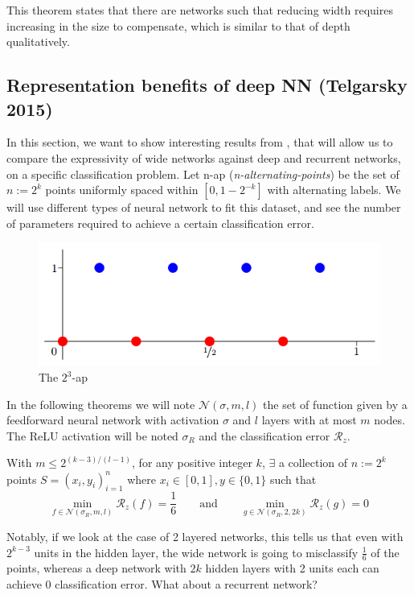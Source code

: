 \documentclass{article}
\begin{document}
This theorem states that there are networks such that reducing width requires increasing in the size to compensate, which is similar to that of depth qualitatively.

\subsection{Representation benefits of deep NN (Telgarsky 2015)}
In this section, we want to show interesting results from \cite{telgarsky2015representation}, that will allow us to compare the expressivity of wide networks against deep and recurrent networks, on a specific classification problem. Let n-ap (\textit{n-alternating-points}) be the set of $n := 2^k$ points  uniformly spaced within $[0, 1-2^{-k}]$ with alternating labels. We will use different types of neural network to fit this dataset, and see the number of parameters required to achieve a certain classification error.
\begin{figure}[H]
    \centering
    \includegraphics[width=.6\textwidth]{figures/nap.png}
    \caption{The $2^3$-ap \cite{telgarsky2015representation}}
\end{figure}

In the following theorems we will note $\mathscr{N}(\sigma, m, l)$ the set of function given by a feedforward neural network with activation $\sigma$ and $l$ layers with at most $m$ nodes. The ReLU activation will be noted $\sigma_R$ and the classification error $\mathcal{R}_z$.

\begin{thm}
\label{thm:telgarskyffn}
With $m \leq 2^{(k-3)/(l-1)}$, for any positive integer $k$, $\exists$ a collection of $n:=2^k$ points $S = (x_i,y_i)^n_{i=1}$ where $x_i \in [0, 1], y \in \{0, 1\}$ such that \\
$$\min_{f\in\mathscr{N}(\sigma_R, m, l)} \mathcal{R}_z(f) = \frac{1}{6} \quad \quad \text{and} \quad \quad \min_{g\in\mathscr{N}(\sigma_R, 2, 2k)} \mathcal{R}_z(g) = 0$$
\end{thm}

Notably, if we look at the case of 2 layered networks, this tells us that even with $2^{k-3}$ units in the hidden layer, the wide network is going to misclassify $\frac{1}{6}$ of the points, whereas a deep network with $2k$ hidden layers with 2 units each can achieve 0 classification error. What about a recurrent network?  \\
\end{document}
